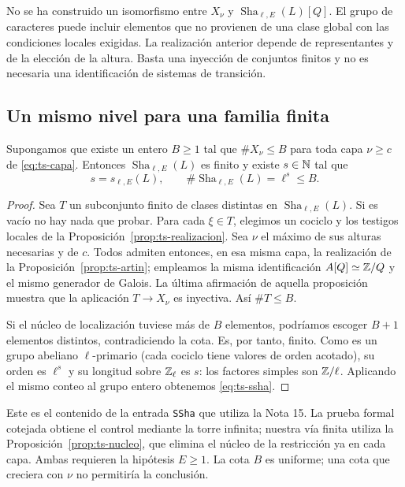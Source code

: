 No se ha construido un isomorfismo entre $X_\nu$ y $\operatorname{Sha}_{\ell,E}(L)[Q]$. El grupo de caracteres puede incluir elementos que no provienen de una clase global con las condiciones locales exigidas. La realización anterior depende de representantes y de la elección de la altura. Basta una inyección de conjuntos finitos y no es necesaria una identificación de sistemas de transición.

\subsection{Un mismo nivel para una familia finita}

\begin{teorema}
\label{thm:ts-ssha}
Supongamos que existe un entero $B\ge1$ tal que $\#X_\nu\le B$ para toda capa $\nu\ge c$ de \eqref{eq:ts-capa}. Entonces $\operatorname{Sha}_{\ell,E}(L)$ es finito y existe $s\in\mathbb{N}$ tal que
\begin{equation}
 s=s_{\ell,E}(L),\qquad
 \#\operatorname{Sha}_{\ell,E}(L)=\ell^s\le B.
 \label{eq:ts-ssha}
\end{equation}
\end{teorema}
\begin{proof}
Sea $T$ un subconjunto finito de clases distintas en $\operatorname{Sha}_{\ell,E}(L)$. Si es vacío no hay nada que probar. Para cada $\xi\in T$, elegimos un cociclo y los testigos locales de la Proposición~\ref{prop:ts-realizacion}. Sea $\nu$ el máximo de sus alturas necesarias y de $c$. Todos admiten entonces, en esa misma capa, la realización de la Proposición~\ref{prop:ts-artin}; empleamos la misma identificación $A[Q]\simeq\mathbb{Z}/Q$ y el mismo generador de Galois. La última afirmación de aquella proposición muestra que la aplicación $T\to X_\nu$ es inyectiva. Así $\#T\le B$.

Si el núcleo de localización tuviese más de $B$ elementos, podríamos escoger $B+1$ elementos distintos, contradiciendo la cota. Es, por tanto, finito. Como es un grupo abeliano $\ell$-primario (cada cociclo tiene valores de orden acotado), su orden es $\ell^s$ y su longitud sobre $\mathbb{Z}_\ell$ es $s$: los factores simples son $\mathbb{Z}/\ell$. Aplicando el mismo conteo al grupo entero obtenemos \eqref{eq:ts-ssha}.
\end{proof}

Este es el contenido de la entrada \texttt{SSha} que utiliza la Nota 15. La prueba formal cotejada obtiene el control mediante la torre infinita; nuestra vía finita utiliza la Proposición~\ref{prop:ts-nucleo}, que elimina el núcleo de la restricción ya en cada capa. Ambas requieren la hipótesis $E\ge1$. La cota $B$ es uniforme; una cota que creciera con $\nu$ no permitiría la conclusión.

